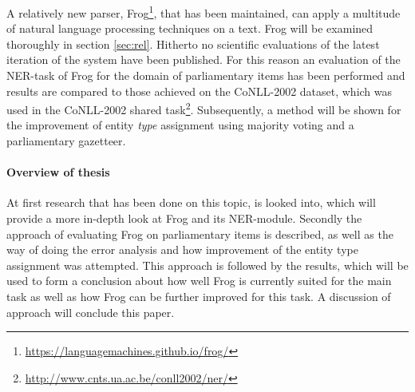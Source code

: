 A relatively new parser, Frog\footnote{\url{https://languagemachines.github.io/frog/}}, that has been maintained, can apply a multitude of natural language processing techniques on a text. Frog will be examined thoroughly in section \ref{sec:rel}. Hitherto no scientific evaluations of the latest iteration of the system have been published. For this reason an evaluation of  the NER-task of Frog for the domain of parliamentary items has been performed and results are compared to those achieved on the CoNLL-2002 dataset, which was used in the CoNLL-2002 shared task\footnote{\url{http://www.cnts.ua.ac.be/conll2002/ner/}}. Subsequently, a method will be shown for the improvement of entity \textit{type} assignment using majority voting and a parliamentary gazetteer.

\paragraph{Overview of thesis}
At first research that has been done on this topic, is looked into, which will provide a more in-depth look at Frog and its NER-module. Secondly the approach of evaluating Frog on parliamentary items is described, as well as the way of doing the error analysis and how improvement of the entity type assignment was attempted. This approach is followed by the results, which will be used to form a conclusion about how well Frog is currently suited for the main task as well as how Frog can be further improved for this task. A discussion of approach will conclude this paper.

